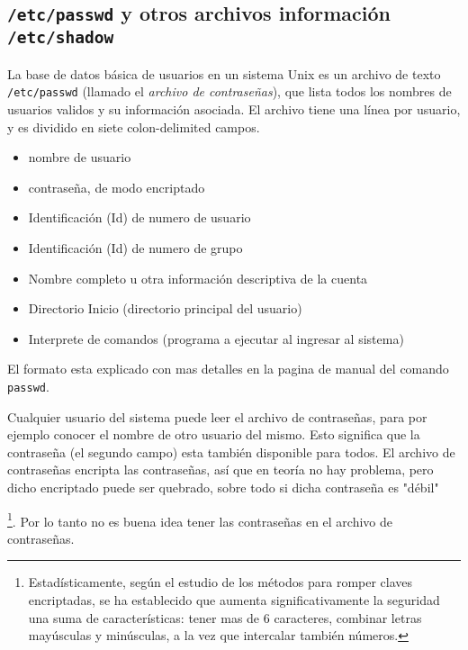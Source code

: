 \subsection{ \texttt{/etc/passwd} y otros archivos información \texttt{/etc/shadow}}

La base de datos básica de usuarios en un sistema Unix es un archivo de
texto  \texttt{/etc/passwd} (llamado el \textit{archivo de
contraseñas}), que lista todos los nombres de usuarios validos y su
información asociada. El archivo tiene una línea por usuario, y es dividido en
siete colon-delimited campos.


	\begin{itemize}
	
	\item{nombre de usuario}
	\item{contraseña, de modo encriptado}
	\item{Identificación (Id) de numero de usuario} 
	\item{Identificación (Id) de numero de grupo} 
	\item{Nombre completo u otra información descriptiva de la cuenta}
	\item{Directorio Inicio (directorio principal del usuario)}
	\item{Interprete de comandos (programa a ejecutar al ingresar al sistema)}

	\end{itemize}

El formato esta explicado con mas detalles en la pagina de manual del comando
\texttt{passwd}.

Cualquier usuario del sistema puede leer el archivo de contraseñas, para
por ejemplo conocer el nombre de otro usuario del mismo. Esto significa que la
contraseña (el segundo campo) esta también disponible para todos. El archivo de
contraseñas encripta las contraseñas, así que en teoría no hay problema, pero
dicho encriptado puede ser quebrado, sobre todo si dicha contraseña es
"débil"

	\footnote{ Estadísticamente, según el estudio de
los métodos para romper claves encriptadas, se ha establecido que aumenta
significativamente la seguridad una suma de características: tener mas de 6
caracteres, combinar letras mayúsculas y minúsculas, a la vez que intercalar
también números.}.  Por lo tanto no es buena idea tener las contraseñas en el archivo
de contraseñas.

